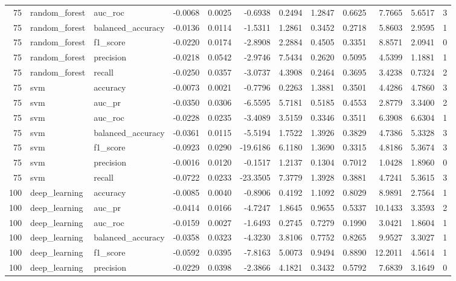 \begin{tabular}{rllrrrrrrrrl}
75 & random_forest & auc_roc & -0.0068 & 0.0025 & -0.6938 & 0.2494 & 1.2847 & 0.6625 & 7.7665 & 5.6517 & 3 \\
75 & random_forest & balanced_accuracy & -0.0136 & 0.0114 & -1.5311 & 1.2861 & 0.3452 & 0.2718 & 5.8603 & 2.9595 & 1 \\
75 & random_forest & f1_score & -0.0220 & 0.0174 & -2.8908 & 2.2884 & 0.4505 & 0.3351 & 8.8571 & 2.0941 & 0 \\
75 & random_forest & precision & -0.0218 & 0.0542 & -2.9746 & 7.5434 & 0.2620 & 0.5095 & 4.5399 & 1.1881 & 1 \\
75 & random_forest & recall & -0.0250 & 0.0357 & -3.0737 & 4.3908 & 0.2464 & 0.3695 & 3.4238 & 0.7324 & 2 \\
75 & svm & accuracy & -0.0073 & 0.0021 & -0.7796 & 0.2263 & 1.3881 & 0.3501 & 4.4286 & 4.7860 & 3 \\
75 & svm & auc_pr & -0.0350 & 0.0306 & -6.5595 & 5.7181 & 0.5185 & 0.4553 & 2.8779 & 3.3400 & 2 \\
75 & svm & auc_roc & -0.0228 & 0.0235 & -3.4089 & 3.5159 & 0.3346 & 0.3511 & 6.3908 & 6.6304 & 1 \\
75 & svm & balanced_accuracy & -0.0361 & 0.0115 & -5.5194 & 1.7522 & 1.3926 & 0.3829 & 4.7386 & 5.3328 & 3 \\
75 & svm & f1_score & -0.0923 & 0.0290 & -19.6186 & 6.1180 & 1.3690 & 0.3315 & 4.8186 & 5.3674 & 3 \\
75 & svm & precision & -0.0016 & 0.0120 & -0.1517 & 1.2137 & 0.1304 & 0.7012 & 1.0428 & 1.8960 & 0 \\
75 & svm & recall & -0.0722 & 0.0233 & -23.3505 & 7.3779 & 1.3928 & 0.3881 & 4.7241 & 5.3615 & 3 \\
100 & deep_learning & accuracy & -0.0085 & 0.0040 & -0.8906 & 0.4192 & 1.1092 & 0.8029 & 8.9891 & 2.7564 & 1 \\
100 & deep_learning & auc_pr & -0.0414 & 0.0166 & -4.7247 & 1.8645 & 0.9655 & 0.5337 & 10.1433 & 3.3593 & 2 \\
100 & deep_learning & auc_roc & -0.0159 & 0.0027 & -1.6493 & 0.2745 & 0.7279 & 0.1990 & 3.0421 & 1.8604 & 1 \\
100 & deep_learning & balanced_accuracy & -0.0358 & 0.0323 & -4.3230 & 3.8106 & 0.7752 & 0.8265 & 9.9527 & 3.3027 & 1 \\
100 & deep_learning & f1_score & -0.0592 & 0.0395 & -7.8163 & 5.0073 & 0.9494 & 0.8890 & 12.2011 & 4.5614 & 1 \\
100 & deep_learning & precision & -0.0229 & 0.0398 & -2.3866 & 4.1821 & 0.3432 & 0.5792 & 7.6839 & 3.1649 & 0 \\

\end{tabular}
